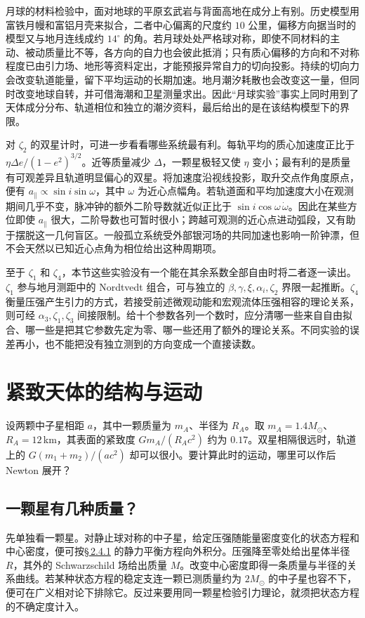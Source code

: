 月球的材料检验中，面对地球的平原玄武岩与背面高地在成分上有别。历史模型用富铁月幔和富铝月壳来拟合，二者中心偏离的尺度约 $10$ 公里，偏移方向据当时的模型又与地月连线成约 $14^\circ$ 的角。若月球处处严格球对称，即使不同材料的主动、被动质量比不等，各方向的自力也会彼此抵消；只有质心偏移的方向和不对称程度已由引力场、地形等资料定出，才能预报异常自力的切向投影。持续的切向力会改变轨道能量，留下平均运动的长期加速。地月潮汐耗散也会改变这一量，但同时改变地球自转，并可借海潮和卫星测量求出。因此“月球实验”事实上同时用到了天体成分分布、轨道相位和独立的潮汐资料，最后给出的是在该结构模型下的界限。

对 $\zeta_2$ 的双星计时，可进一步看看哪些系统最有利。每轨平均的质心加速度正比于 $\eta\Delta e/(1-e^2)^{3/2}$。近等质量减少 $\Delta$，一颗星极轻又使 $\eta$ 变小；最有利的是质量有可观差异且轨道明显偏心的双星。将加速度沿视线投影，取升交点作角度原点，便有 $a_\parallel\propto\sin i\sin\omega$，其中 $\omega$ 为近心点幅角。若轨道面和平均加速度大小在观测期间几乎不变，脉冲钟的额外二阶导数就近似正比于 $\sin i\cos\omega\,\dot\omega$。因此在某些方位即使 $a_\parallel$ 很大，二阶导数也可暂时很小；跨越可观测的近心点进动弧段，又有助于摆脱这一几何盲区。一般孤立系统受外部银河场的共同加速也影响一阶钟漂，但不会天然以已知近心点角为相位给出这种周期项。

至于 $\zeta_1$ 和 $\zeta_4$，本节这些实验没有一个能在其余系数全部自由时将二者逐一读出。$\zeta_1$ 参与地月测距中的 Nordtvedt 组合，可与独立的 $\beta,\gamma,\xi,\alpha_i,\zeta_2$ 界限一起推断。$\zeta_4$ 衡量压强产生引力的方式，若接受前述微观动能和宏观流体压强相容的理论关系，则可经 $\alpha_3,\zeta_1,\zeta_3$ 间接限制。给十个参数各列一个数时，应分清哪一些来自自由拟合、哪一些是把其它参数先定为零、哪一些还用了额外的理论关系。不同实验的误差再小，也不能把没有独立测到的方向变成一个直接读数。

\section{紧致天体的结构与运动}

设两颗中子星相距 $a$，其中一颗质量为 $m_A$、半径为 $R_A$。取 $m_A=1.4M_\odot$、$R_A=12$\,km，其表面的紧致度 $Gm_A/(R_Ac^2)$ 约为 $0.17$。双星相隔很远时，轨道上的 $G(m_1+m_2)/(ac^2)$ 却可以很小。要计算此时的运动，哪里可以作后 Newton 展开？

\subsection{一颗星有几种质量？}

先单独看一颗星。对静止球对称的中子星，给定压强随能量密度变化的状态方程和中心密度，便可按\hyperlink{subsection.2.4.1}{\S\,2.4.1} 的静力平衡方程向外积分。压强降至零处给出星体半径 $R$，其外的 Schwarzschild 场给出质量 $M$。改变中心密度即得一条质量与半径的关系曲线。若某种状态方程的稳定支连一颗已测质量约为 $2M_\odot$ 的中子星也容不下，便可在广义相对论下排除它。反过来要用同一颗星检验引力理论，就须把状态方程的不确定度计入。

